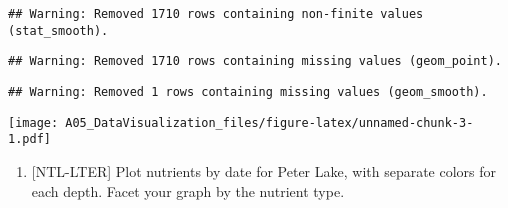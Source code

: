 \documentclass[]{article}
\newenvironment{Shaded}{\begin{snugshade}}{\end{snugshade}}
\newcommand{\KeywordTok}[1]{\textcolor[rgb]{0.13,0.29,0.53}{\textbf{#1}}}
\newcommand{\DataTypeTok}[1]{\textcolor[rgb]{0.13,0.29,0.53}{#1}}
\newcommand{\DecValTok}[1]{\textcolor[rgb]{0.00,0.00,0.81}{#1}}
\newcommand{\StringTok}[1]{\textcolor[rgb]{0.31,0.60,0.02}{#1}}
\newcommand{\CommentTok}[1]{\textcolor[rgb]{0.56,0.35,0.01}{\textit{#1}}}
\newcommand{\OperatorTok}[1]{\textcolor[rgb]{0.81,0.36,0.00}{\textbf{#1}}}
\newcommand{\NormalTok}[1]{#1}
\providecommand{\tightlist}{%
  \setlength{\itemsep}{0pt}\setlength{\parskip}{0pt}}
\begin{document}
\begin{Shaded}
\end{Shaded}

\begin{verbatim}
## Warning: Removed 1710 rows containing non-finite values (stat_smooth).
\end{verbatim}

\begin{verbatim}
## Warning: Removed 1710 rows containing missing values (geom_point).
\end{verbatim}

\begin{verbatim}
## Warning: Removed 1 rows containing missing values (geom_smooth).
\end{verbatim}

\texttt{[image: A05\_DataVisualization\_files/figure-latex/unnamed-chunk-3-1.pdf]}

\begin{enumerate}
\def\labelenumi{\arabic{enumi}.}
\setcounter{enumi}{4}
\tightlist
\item
  {[}NTL-LTER{]} Plot nutrients by date for Peter Lake, with separate
  colors for each depth. Facet your graph by the nutrient type.
\end{enumerate}
\end{document}
